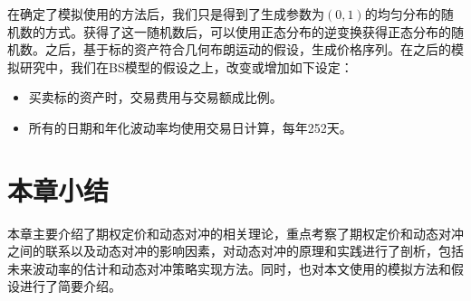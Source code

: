 在确定了模拟使用的方法后，我们只是得到了生成参数为$(0,1)$的均匀分布的随机数的方式。获得了这一随机数后，可以使用正态分布的逆变换获得正态分布的随机数。之后，基于标的资产符合几何布朗运动的假设，生成价格序列。在之后的模拟研究中，我们在BS模型的假设之上，改变或增加如下设定：

\begin{itemize}
  \item 买卖标的资产时，交易费用与交易额成比例。
  \item 所有的日期和年化波动率均使用交易日计算，每年252天。
\end{itemize}

\section{本章小结}

本章主要介绍了期权定价和动态对冲的相关理论，重点考察了期权定价和动态对冲之间的联系以及动态对冲的影响因素，对动态对冲的原理和实践进行了剖析，包括未来波动率的估计和动态对冲策略实现方法。同时，也对本文使用的模拟方法和假设进行了简要介绍。
